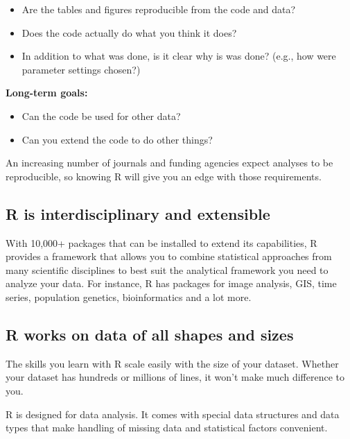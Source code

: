 \documentclass[
]{book}
\providecommand{\tightlist}{%
  \setlength{\itemsep}{0pt}\setlength{\parskip}{0pt}}
\begin{document}
\begin{itemize}
\tightlist
\item
  Are the tables and figures reproducible from the code and data?
\item
  Does the code actually do what you think it does?
\item
  In addition to what was done, is it clear why is was done? (e.g., how were parameter settings chosen?)
\end{itemize}

\textbf{Long-term goals:}

\begin{itemize}
\tightlist
\item
  Can the code be used for other data?
\item
  Can you extend the code to do other things?
\end{itemize}

An increasing number of journals and funding agencies expect analyses to be reproducible, so knowing R will give you an edge with those requirements.

\subsection*{R is interdisciplinary and extensible}\label{r-is-interdisciplinary-and-extensible}

With 10,000+ packages that can be installed to extend its capabilities, R provides a framework that allows you to combine statistical approaches from many scientific disciplines to best suit the analytical framework you need to analyze your data. For instance, R has packages for image analysis, GIS, time series, population genetics, bioinformatics and a lot more.

\subsection*{R works on data of all shapes and sizes}\label{r-works-on-data-of-all-shapes-and-sizes}

The skills you learn with R scale easily with the size of your dataset. Whether your dataset has hundreds or millions of lines, it won't make much difference to you.

R is designed for data analysis. It comes with special data structures and data types that make handling of missing data and statistical factors convenient.
\end{document}
